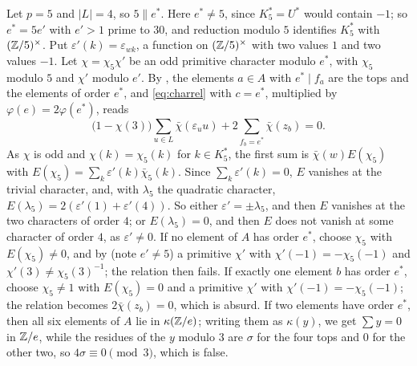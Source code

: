 Let $p=5$ and $|L|=4$, so $5\parallel e^{*}$. Here $e^{*}\ne5$, since
$K^{*}_{5}=U^{*}$ would contain $-1$; so $e^{*}=5e'$ with $e'>1$ prime to
$30$, and reduction modulo $5$ identifies $K^{*}_{5}$ with
$(\mathbb{Z}/5)^{\times}$. Put $\varepsilon'(k)=\varepsilon_{wk}$, a function on
$(\mathbb{Z}/5)^{\times}$ with two values $1$ and two values $-1$. Let
$\chi=\chi_{5}\chi'$ be an odd primitive character modulo $e^{*}$, with
$\chi_{5}$ modulo $5$ and $\chi'$ modulo $e'$. By , the
elements $a\in A$ with $e^{*}\mid f_{a}$ are the tops and the elements of
order $e^{*}$, and \eqref{eq:charrel} with $c=e^{*}$, multiplied by
$\varphi(e)=2\varphi(e^{*})$, reads
\[
  \bigl(1-\chi(3)\bigr)\sum_{u\in L}\bar\chi(\varepsilon_{u}u)
  +2\sum_{f_{b}=e^{*}}\bar\chi(z_{b})=0.
\]
As $\chi$ is odd and $\chi(k)=\chi_{5}(k)$ for $k\in K^{*}_{5}$, the first
sum is $\bar\chi(w)E(\chi_{5})$ with $E(\chi_{5})=\sum_{k}\varepsilon'(k)
\bar\chi_{5}(k)$. Since $\sum_{k}\varepsilon'(k)=0$, $E$ vanishes at the
trivial character, and, with $\lambda_{5}$ the quadratic character,
$E(\lambda_{5})=2(\varepsilon'(1)+\varepsilon'(4))$. So either
$\varepsilon'=\pm\lambda_{5}$, and then $E$ vanishes at the two characters
of order $4$; or $E(\lambda_{5})=0$, and then $E$ does not vanish at some
character of order $4$, as $\varepsilon'\ne0$. If no element of $A$ has
order $e^{*}$, choose $\chi_{5}$ with $E(\chi_{5})\ne0$, and by
 (note $e'\ne5$) a primitive $\chi'$ with
$\chi'(-1)=-\chi_{5}(-1)$ and $\chi'(3)\ne\chi_{5}(3)^{-1}$; the relation
then fails. If exactly one element $b$ has order $e^{*}$, choose
$\chi_{5}\ne1$ with $E(\chi_{5})=0$ and a primitive $\chi'$ with
$\chi'(-1)=-\chi_{5}(-1)$; the relation becomes $2\bar\chi(z_{b})=0$, which
is absurd. If two elements have order $e^{*}$, then all six elements of $A$
lie in $\kappa(\mathbb{Z}/e)$; writing them as $\kappa(y)$, we get $\sum y=0$ in
$\mathbb{Z}/e$, while the residues of the $y$ modulo $3$ are $\sigma$ for the four
tops and $0$ for the other two, so $4\sigma\equiv0\pmod3$, which is false.

